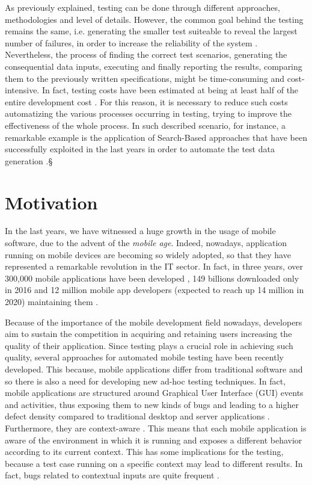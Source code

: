 As previously explained, testing can be done through different approaches, methodologies and level of details. However, the common goal behind the testing remains the same, i.e. generating the smaller test suiteable to reveal the largest number of failures, in order to increase the reliability of the system \cite{grano}. 
Nevertheless, the process of finding the correct test scenarios, generating the consequential data inputs, executing and finally reporting the results, comparing them to the previously written specifications, might be time-consuming and cost-intensive. In fact, testing costs have been estimated at being at least half of the entire development cost \cite{Beizer:1990:STT:79060}. For this reason, it is necessary to reduce such costs automatizing the various processes occurring in testing, trying to improve the effectiveness of the whole process. In such described scenario, for instance, a remarkable example is the application of Search-Based approaches that have been successfully exploited in the last years in order to automate the test data generation \cite{Harman_et_al_2015}.§

\section{Motivation}
In the last years, we have witnessed a huge growth in the usage of mobile software, due to the advent of the \textit{mobile age}. Indeed, nowadays, application running on mobile devices are becoming so widely adopted, so that they have represented a remarkable revolution in the IT sector. In fact, in three years, over 300,000 mobile applications have been developed \cite{muccini}, 149 billions downloaded only in 2016 \cite{statista} and 12 million mobile app developers (expected to reach up 14 million in 2020) maintaining them \cite{DevRelate}. 

Because of the importance of the mobile development field nowadays, developers aim to sustain the competition in acquiring and retaining users increasing the quality of their application. 
Since testing plays a crucial role in achieving such quality, several approaches for automated mobile testing have been recently developed. This because, mobile applications differ from traditional software and so there is also a need for developing new ad-hoc testing techniques. 
In fact, mobile applications are structured around Graphical User Interface (GUI) events and activities, thus exposing them to new kinds of bugs and leading to a higher defect density compared to traditional desktop and server applications \cite{Hu:2011:AGT:1982595.1982612}. Furthermore, they are context-aware \cite{muccini}. 
This means that each mobile application is aware of the environment in which it is running and exposes a different behavior according to its current context. This has some implications for the testing, because a test case running on a specific context may lead to different results. In fact, bugs related to contextual inputs are quite frequent \cite{muccini}. 

